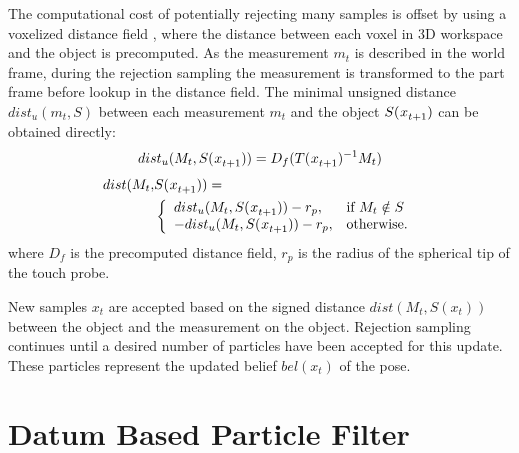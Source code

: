 \documentclass[letterpaper, 10 pt, conference]{ieeeconf}
\newcommand{\measurement}{m}
\begin{document}
The computational cost of potentially rejecting many samples is offset by using a voxelized distance field \cite{Felzenszwalb2004}, where the distance between each voxel in 3D workspace and the object is precomputed. 
As the measurement $\measurement_t$ is described in the world frame, during the rejection sampling the measurement is transformed to the part frame before lookup in the distance field.
The minimal unsigned distance $dist_u(\measurement_t,S)$ between each measurement $\measurement_t$ and the object $S(\particle[t+1])$ can be obtained directly\cite{Saund2017}: 
\begin{align}\label{eq:unsigned}
dist_u(M_t,S(\particle[t+1])) = D_f(T(\particle[t+1])^{-1}M_t)
\end{align}
\begin{align}\label{eq:signed}
dist(M_t,&S(\particle[t+1])) =\\
 &\left\{
\begin{array}{ll}
dist_u(M_t,S(\particle[t+1])) - r_p, & \text{if }M_t\notin S\\
-dist_u(M_t,S(\particle[t+1])) - r_p, & \text{otherwise}.
\end{array}
\right.
\end{align}  
where $D_f$ is the precomputed distance field, $r_p$ is the radius of the spherical tip of the touch probe. 

New samples $x_t$ are accepted based on the signed distance $dist(M_t,S(x_t))$ between the object and the measurement on the object. Rejection sampling continues until a desired number of particles have been accepted for this update. 
These particles represent the updated belief $bel(x_t)$ of the pose. 


\section{Datum Based Particle Filter} \label{sec:datum}
\end{document}
